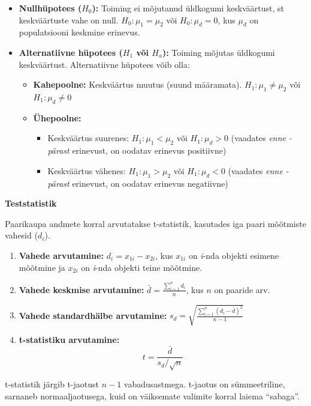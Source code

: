 \documentclass[
]{book}
\providecommand{\tightlist}{%
  \setlength{\itemsep}{0pt}\setlength{\parskip}{0pt}}
\theoremstyle{definition}
\theoremstyle{definition}
\theoremstyle{definition}
\theoremstyle{definition}
\theoremstyle{remark}
\begin{document}
\begin{itemize}
\item
  \textbf{Nullhüpotees (\(H_0\)):} Toiming ei mõjutanud üldkogumi keskväärtust, st keskväärtuste vahe on null.
  \(H_0: \mu_1 = \mu_2\) või \(H_0: \mu_d = 0\), kus \(\mu_d\) on populatsiooni keskmine erinevus.
\item
  \textbf{Alternatiivne hüpotees (\(H_1\) või \(H_a\)):} Toiming mõjutas üldkogumi keskväärtust. Alternatiivne hüpotees võib olla:

  \begin{itemize}
  \tightlist
  \item
    \textbf{Kahepoolne:} Keskväärtus muutus (suund määramata).
    \(H_1: \mu_1 \neq \mu_2\) või \(H_1: \mu_d \neq 0\)
  \item
    \textbf{Ühepoolne:}

    \begin{itemize}
    \tightlist
    \item
      Keskväärtus suurenes: \(H_1: \mu_1 < \mu_2\) või \(H_1: \mu_d > 0\) (vaadates \emph{enne - pärast} erinevust, on oodatav erinevus positiivne)
    \item
      Keskväärtus vähenes: \(H_1: \mu_1 > \mu_2\) või \(H_1: \mu_d < 0\) (vaadates \emph{enne - pärast} erinevust, on oodatav erinevus negatiivne)
    \end{itemize}
  \end{itemize}
\end{itemize}

\textbf{Teststatistik}

Paarikaupa andmete korral arvutatakse t-statistik, kasutades iga paari mõõtmiste vahesid (\(d_i\)).

\begin{enumerate}
\def\labelenumi{\arabic{enumi}.}
\item
  \textbf{Vahede arvutamine:} \(d_i = x_{1i} - x_{2i}\), kus \(x_{1i}\) on \emph{i}-nda objekti esimene mõõtmine ja \(x_{2i}\) on \emph{i}-nda objekti teine mõõtmine.
\item
  \textbf{Vahede keskmise arvutamine:} \(\bar{d} = \frac{\sum_{i=1}^{n} d_i}{n}\), kus \(n\) on paaride arv.
\item
  \textbf{Vahede standardhälbe arvutamine:} \(s_d = \sqrt{\frac{\sum_{i=1}^{n} (d_i - \bar{d})^2}{n-1}}\)
\item
  \textbf{t-statistiku arvutamine:}
  \[t = \frac{\bar{d}}{s_d / \sqrt{n}}\]
\end{enumerate}

t-statistik järgib t-jaotust \(n-1\) vabadusastmega. t-jaotus on sümmeetriline, sarnaneb normaaljaotusega, kuid on väiksemate valimite korral laiema ``sabaga''.
\end{document}
